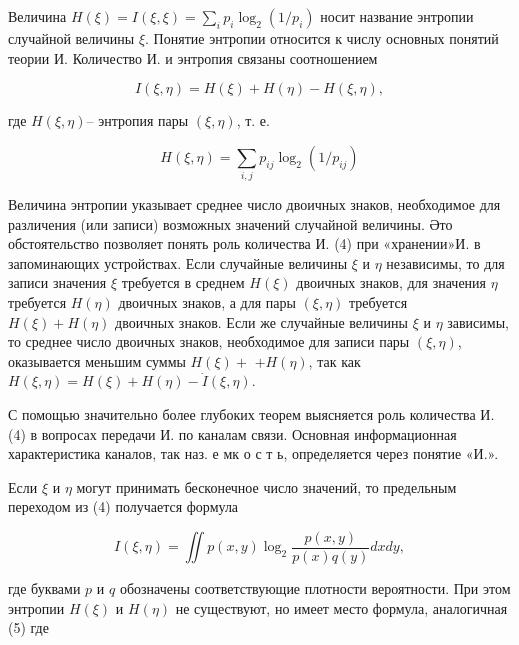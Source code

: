 \documentclass[10pt]{article}
\begin{document}
Величина $H(\xi)=I(\xi, \xi)=\sum_{i} p_{i} \log _{2}\left(1 / p_{i}\right)$ носит название энтропии случайной величины $\xi$. Понятие энтропии относится к числу основных понятий теории И. Количество И. и энтропия связаны соотношением



\[

I(\xi, \eta)=H(\xi)+H(\eta)-H(\xi, \eta),

\]



где $H(\xi, \eta)$-- энтропия пары $(\xi, \eta)$, т. е.



\[

H(\xi, \eta)=\sum_{i, j} p_{i j} \log _{2}\left(1 / p_{i j}\right)

\]



Величина энтропии указывает среднее число двоичных знаков, необходимое для различения (или записи) возможных значений случайной величины. Әто обстоятельство позволяет понять роль количества И. (4) при «хранении»И. в запоминающих устройствах. Если случайные величины $\xi$ и $\eta$ независимы, то для записи значения $\xi$ требуется в среднем $H(\xi)$ двоичных знаков, для значения $\eta$ требуется $H(\eta)$ двоичных знаков, а для пары $(\xi, \eta)$ требуется $H(\xi)+H(\eta)$ двоичных знаков. Если же случайные величины $\xi$ и $\eta$ зависимы, то среднее число двоичных знаков, необходимое для записи пары $(\xi, \eta)$, оказывается меньшим суммы $H(\xi)+$ $+H(\eta)$, так как $H(\xi, \eta)=H(\xi)+H(\eta)-\dot{I}(\xi, \eta)$.



С помощью значительно более глубоких теорем выясняется роль количества И. (4) в вопросах передачи И. по каналам связи. Основная информационная характеристика каналов, так наз. е мк о с т ь, определяется через понятие «И.».



Если $\xi$ и $\eta$ могут принимать бесконечное число значений, то предельным переходом из (4) получается формула



\[

I(\xi, \eta)=\iint p(x, y) \log _{2} \frac{p(x, y)}{p(x) q(y)} d x d y,

\]



где буквами $p$ и $q$ обозначены соответствующие плотности вероятности. При этом энтропии $H(\xi)$ и $H(\eta)$ не существуют, но имеет место формула, аналогичная (5) где
\end{document}
